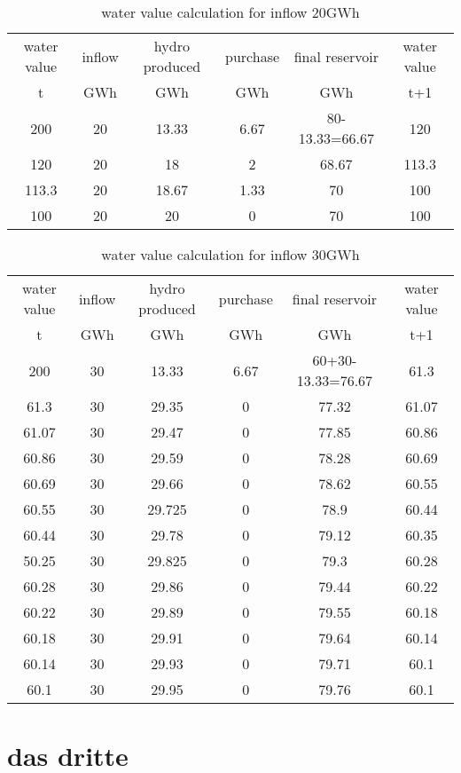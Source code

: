 \documentclass{article}
\begin{document}
\begin{table}
\begin{center}
\begin{tabular}{|c|c|c|c|c|c|}
\hline
water value & inflow & hydro produced & purchase & final reservoir	& water value\\
    t       &  GWh   &    GWh         &     GWh       &     GWh         & t+1 \\
\hline
\hline
200 & 20 & 13.33 & 6.67 & 80-13.33=66.67 & 120\\
120 & 20 & 18 & 2 & 68.67 & 113.3\\
113.3 & 20 & 18.67 & 1.33 & 70 & 100\\
\hline
100 & 20 & 20 & 0 & 70 & 100\\
\hline
\end{tabular}
\caption{water value calculation for inflow 20GWh}
\label{tab:20}
\end{center}
\end{table}

\begin{table}
\begin{center}
\begin{tabular}{|c|c|c|c|c|c|}
\hline
water value & inflow & hydro produced & purchase & final reservoir	& water value\\
    t       &  GWh   &    GWh         &     GWh       &     GWh         & t+1 \\
\hline
\hline
200 & 30 & 13.33 & 6.67 & 60+30-13.33=76.67 & 61.3\\
61.3 & 30 & 29.35 & 0 & 77.32 & 61.07\\
61.07 & 30 & 29.47 & 0 & 77.85 & 60.86\\
60.86 & 30 & 29.59 & 0 & 78.28 & 60.69\\
60.69 & 30 & 29.66 & 0 & 78.62 & 60.55\\
60.55 & 30 & 29.725 & 0 & 78.9 & 60.44\\
60.44 & 30 & 29.78 & 0 & 79.12 & 60.35\\
50.25 & 30 & 29.825 & 0 & 79.3 & 60.28\\
60.28 & 30 & 29.86 & 0 & 79.44 & 60.22\\
60.22 & 30 & 29.89 & 0 & 79.55 & 60.18\\
60.18 & 30 & 29.91 & 0 & 79.64 & 60.14\\
60.14 & 30 & 29.93 & 0 & 79.71 & 60.1\\
\hline
60.1 & 30 & 29.95 & 0 & 79.76 & 60.1\\
\hline
\end{tabular}
\caption{water value calculation for inflow 30GWh}
\label{tab:30}
\end{center}
\end{table}

\section{das dritte}
\end{document}
